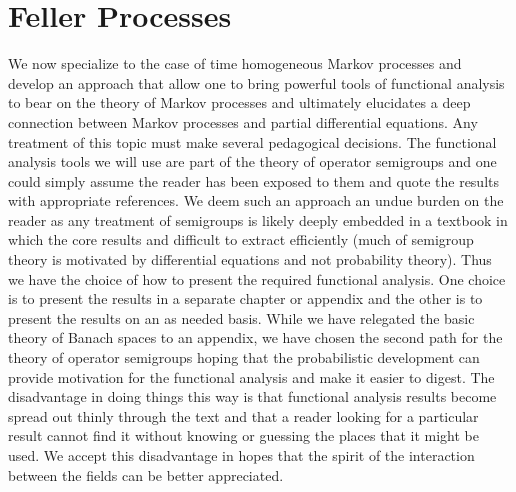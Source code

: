 \chapter{Feller Processes}

We now specialize to the case of time homogeneous Markov processes and
develop an approach that allow one to bring powerful tools of
functional analysis to bear on the theory of Markov processes and
ultimately elucidates a deep connection between Markov processes and
partial differential equations.  Any treatment of this topic must make several pedagogical
decisions.  The functional analysis tools we will use are part of the theory of operator
semigroups and one could simply assume the reader has been exposed to them and quote the
results with appropriate references.  We deem such an approach an undue burden on the reader
as any treatment of semigroups is likely deeply embedded in a textbook in which the core results
and difficult to extract efficiently (much of semigroup theory is motivated by differential equations and
not probability theory).  Thus we have the choice of how to present the required functional
analysis.  One choice is to present the results in a separate chapter or appendix and the other is to 
present the results on an as needed basis.  While we have relegated the basic theory of Banach spaces to
an appendix, we have chosen the second path for the theory of operator semigroups hoping that the 
probabilistic development can provide motivation for the functional analysis and make it
easier to digest.  The disadvantage in doing things this way is that functional analysis results become spread
out thinly through the text and that a reader looking for a particular result cannot find it without knowing or guessing
the places that it might be used.  We accept this disadvantage in hopes that the spirit of the interaction between
the fields can be better appreciated.

